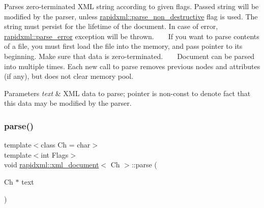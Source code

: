 Parses zero-\/terminated X\+ML string according to given flags. Passed string will be modified by the parser, unless \mbox{\hyperlink{namespacerapidxml_a45d4d8fef551beaaba23a83b847fd6a3}{rapidxml\+::parse\+\_\+non\+\_\+destructive}} flag is used. The string must persist for the lifetime of the document. In case of error, \mbox{\hyperlink{classrapidxml_1_1parse__error}{rapidxml\+::parse\+\_\+error}} exception will be thrown. ~\newline
~\newline
 If you want to parse contents of a file, you must first load the file into the memory, and pass pointer to its beginning. Make sure that data is zero-\/terminated. ~\newline
~\newline
 Document can be parsed into multiple times. Each new call to parse removes previous nodes and attributes (if any), but does not clear memory pool. 
\begin{DoxyParams}{Parameters}
{\em text} & X\+ML data to parse; pointer is non-\/const to denote fact that this data may be modified by the parser. \\
\hline
\end{DoxyParams}
\mbox{\label{classrapidxml_1_1xml__document_ac6e73ff9ac323bf5a370c38feb03a6b1}} 
\subsubsection{\texorpdfstring{parse()}{parse()}\hspace{0.1cm}{\footnotesize\ttfamily [2/2]}}
{\footnotesize\ttfamily template$<$class Ch  = char$>$ \\
template$<$int Flags$>$ \\
void \mbox{\hyperlink{classrapidxml_1_1xml__document}{rapidxml\+::xml\+\_\+document}}$<$ Ch $>$\+::parse (\begin{DoxyParamCaption}\item[{Ch $\ast$}]{text }\end{DoxyParamCaption})\hspace{0.3cm}{\ttfamily [inline]}}

